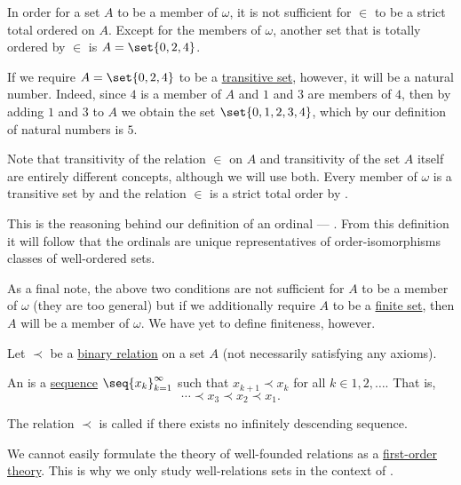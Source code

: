 \begin{remark}
  In order for a set \( A \) to be a member of \( \omega \), it is not sufficient for \( \in \) to be a strict total ordered on \( A \). Except for the members of \( \omega \), another set that is totally ordered by \( \in \) is \( A = \set{ 0, 2, 4 } \).

  If we require \( A = \set{ 0, 2, 4 } \) to be a \hyperref[def:transitive_set]{transitive set}, however, it will be a natural number. Indeed, since \( 4 \) is a member of \( A \) and \( 1 \) and \( 3 \) are members of \( 4 \), then by adding \( 1 \) and \( 3 \) to \( A \) we obtain the set \( \set{ 0, 1, 2, 3, 4 } \), which by our definition of natural numbers is \( 5 \).

  Note that transitivity of the relation \( \in \) on \( A \) and transitivity of the set \( A \) itself are entirely different concepts, although we will use both. Every member of \( \omega \) is a transitive set by  and the relation \( \in \) is a strict total order by .

  This is the reasoning behind our definition of an ordinal --- . From this definition it will follow that the ordinals are unique representatives of order-isomorphisms classes of well-ordered sets.

  As a final note, the above two conditions are not sufficient for \( A \) to be a member of \( \omega \) (they are too general) but if we additionally require \( A \) to be a \hyperref[def:infinite_set]{finite set}, then \( A \) will be a member of \( \omega \). We have yet to define finiteness, however.
\end{remark}

\begin{definition}\label{def:well_founded_relation}
  Let \( \prec \) be a \hyperref[def:binary_relation]{binary relation} on a set \( A \) (not necessarily satisfying any axioms).

  An  is a \hyperref[def:sequence]{sequence} \( \seq{ x_k }_{k=1}^\infty \) such that \( x_{k+1} \prec x_k \) for all \( k \in 1, 2, \ldots \). That is,
  \begin{equation*}
    \cdots \prec x_3 \prec x_2 \prec x_1.
  \end{equation*}

  The relation \( \prec \) is called  if there exists no infinitely descending sequence.

  We cannot easily formulate the theory of well-founded relations as a \hyperref[def:first_order_theory]{first-order theory}. This is why we only study well-relations sets in the context of .
\end{definition}

